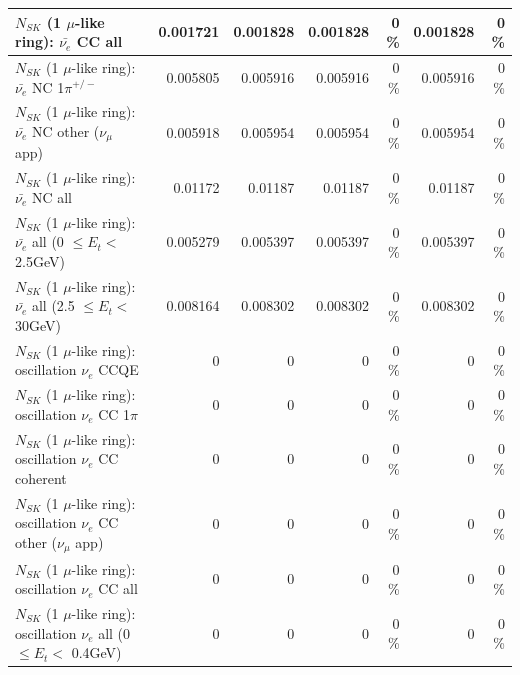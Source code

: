 \begin{table}
\begin{tabular}{| l | r | r | r  r | r  r |}
                            $N_{SK}$ (1 $\mu$-like ring): $\bar{\nu_{e}}$ CC all &        0.001721 &        0.001828 &        0.001828 &        0 \%  &        0.001828 &        0 \%  \\ 
\hline
                     $N_{SK}$ (1 $\mu$-like ring): $\bar{\nu_e}$ NC 1$\pi^{+/-}$ &        0.005805 &        0.005916 &        0.005916 &        0 \%  &        0.005916 &        0 \%  \\ 
            $N_{SK}$ (1 $\mu$-like ring): $\bar{\nu_e}$ NC other ($\nu_\mu$ app) &        0.005918 &        0.005954 &        0.005954 &        0 \%  &        0.005954 &        0 \%  \\ 
                            $N_{SK}$ (1 $\mu$-like ring): $\bar{\nu_{e}}$ NC all &         0.01172 &         0.01187 &         0.01187 &        0 \%  &         0.01187 &        0 \%  \\ 
\hline
     $N_{SK}$ (1 $\mu$-like ring): $\bar{\nu_{e}}$ all (0 $\leq E_{t} <$ 2.5GeV) &        0.005279 &        0.005397 &        0.005397 &        0 \%  &        0.005397 &        0 \%  \\ 
    $N_{SK}$ (1 $\mu$-like ring): $\bar{\nu_{e}}$ all (2.5 $\leq E_{t} <$ 30GeV) &        0.008164 &        0.008302 &        0.008302 &        0 \%  &        0.008302 &        0 \%  \\ 
\hline
\hline
\hline
                          $N_{SK}$ (1 $\mu$-like ring): oscillation $\nu_e$ CCQE &               0 &               0 &               0 &        0 \%  &               0 &        0 \%  \\ 
                     $N_{SK}$ (1 $\mu$-like ring): oscillation $\nu_e$ CC 1$\pi$ &               0 &               0 &               0 &        0 \%  &               0 &        0 \%  \\ 
                   $N_{SK}$ (1 $\mu$-like ring): oscillation $\nu_e$ CC coherent &               0 &               0 &               0 &        0 \%  &               0 &        0 \%  \\ 
      $N_{SK}$ (1 $\mu$-like ring): oscillation $\nu_e$ CC other ($\nu_\mu$ app) &               0 &               0 &               0 &        0 \%  &               0 &        0 \%  \\ 
                       $N_{SK}$ (1 $\mu$-like ring): oscillation $\nu_e$  CC all &               0 &               0 &               0 &        0 \%  &               0 &        0 \%  \\ 
\hline
$N_{SK}$ (1 $\mu$-like ring): oscillation $\nu_{e}$ all (0 $\leq E_{t} <$ 0.4GeV) &               0 &               0 &               0 &        0 \%  &               0 &        0 \%  \\ 

\end{tabular}
\end{table}

